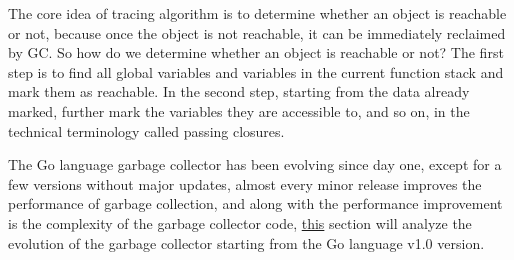 \documentclass[a4paper]{exam}
\theoremstyle{definition}
\begin{document}
The core idea of tracing algorithm is to determine whether an object is reachable or not, because once the object is not reachable, it can be immediately reclaimed by GC. So how do we determine whether an object is reachable or not? The first step is to find all global variables and variables in the current function stack and mark them as reachable. In the second step, starting from the data already marked, further mark the variables they are accessible to, and so on, in the technical terminology called passing closures.

The Go language garbage collector has been evolving since day one, except for a few versions without major updates, almost every minor release improves the performance of garbage collection, and along with the performance improvement is the complexity of the garbage collector code, \href{https://draveness.me/golang/docs/part3-runtime/ch07-memory/golang-garbage-collector/}{this} section will analyze the evolution of the garbage collector starting from the Go language v1.0 version.
\end{document}
